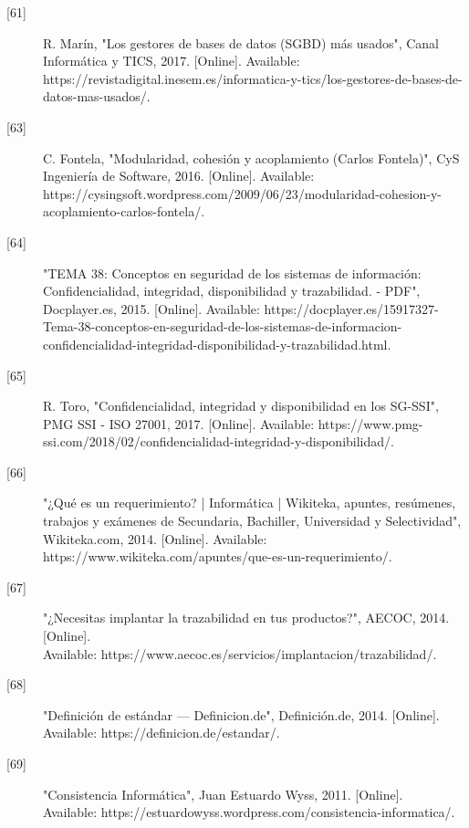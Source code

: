 \begin{description}
		\item[\hypertarget{b61}{[61]}] R. Marín, "Los gestores de bases de datos (SGBD) más usados", Canal Informática y TICS, 2017. [Online]. Available: https://revistadigital.inesem.es/informatica-y-tics/los-gestores-de-bases-de-datos-mas-usados/.
		
		\item[\hypertarget{b63}{[63]}] C. Fontela, "Modularidad, cohesión y acoplamiento (Carlos Fontela)", CyS Ingeniería de Software, 2016. [Online]. Available: https://cysingsoft.wordpress.com/2009/06/23/modularidad-cohesion-y-acoplamiento-carlos-fontela/.
		
		\item[\hypertarget{b64}{[64]}] "TEMA 38: Conceptos en seguridad de los sistemas de información: Confidencialidad, integridad, disponibilidad y trazabilidad. - PDF", Docplayer.es, 2015. [Online]. Available: https://docplayer.es/15917327-Tema-38-conceptos-en-seguridad-de-los-sistemas-de-informacion-confidencialidad-integridad-disponibilidad-y-trazabilidad.html. 
		
		\item[\hypertarget{b65}{[65]}] R. Toro, "Confidencialidad, integridad y disponibilidad en los SG-SSI", PMG SSI - ISO 27001, 2017. [Online]. Available: https://www.pmg-ssi.com/2018/02/confidencialidad-integridad-y-disponibilidad/. 
		
		\item[\hypertarget{b66}{[66]}] "¿Qué es un requerimiento? | Informática | Wikiteka, apuntes, resúmenes, trabajos y exámenes de Secundaria, Bachiller, Universidad y Selectividad", Wikiteka.com, 2014. [Online]. Available: https://www.wikiteka.com/apuntes/que-es-un-requerimiento/. 
		
		\item[\hypertarget{b67}{[67]}] "¿Necesitas implantar la trazabilidad en tus productos?", AECOC, 2014. [Online].\\ Available: https://www.aecoc.es/servicios/implantacion/trazabilidad/. 
		
		\item[\hypertarget{b68}{[68]}] "Definición de estándar — Definicion.de", Definición.de, 2014. [Online].\\ Available: https://definicion.de/estandar/. 
		
		\item[\hypertarget{b69}{[69]}] "Consistencia Informática", Juan Estuardo Wyss, 2011. [Online].\\ Available: https://estuardowyss.wordpress.com/consistencia-informatica/. 
\end{description}